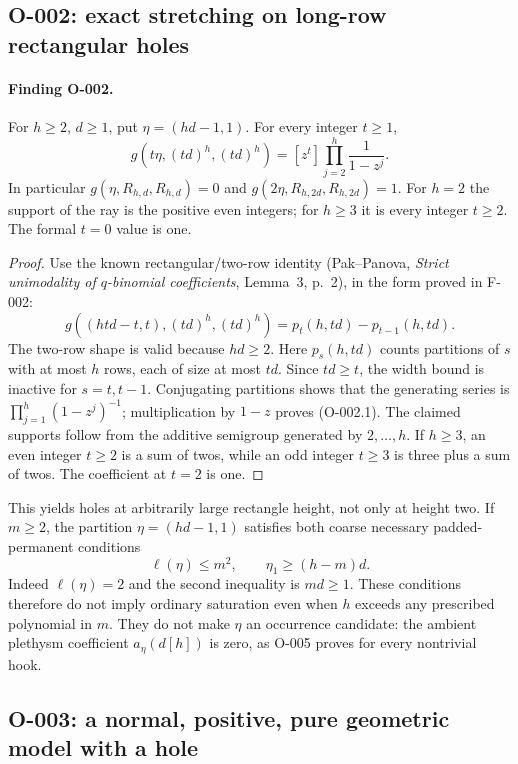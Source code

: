 \subsection{O-002: exact stretching on long-row rectangular holes}

\paragraph{Finding O-002.}
For $h\geq2$, $d\geq1$, put $\eta=(hd-1,1)$.  For every integer
$t\geq1$,
\[
 g(t\eta,(td)^h,(td)^h)
       =[z^t]\prod_{j=2}^{h}\frac1{1-z^j}.                 \tag{O-002.1}
\]
In particular $g(\eta,R_{h,d},R_{h,d})=0$ and
$g(2\eta,R_{h,2d},R_{h,2d})=1$.  For $h=2$ the support of the ray is
the positive even integers; for $h\geq3$ it is every integer $t\geq2$.
The formal $t=0$ value is one.

\begin{proof}
Use the known rectangular/two-row identity (Pak--Panova, \emph{Strict
unimodality of $q$-binomial coefficients}, Lemma~3, p.~2), in the form
proved in F-002:
\[
 g((htd-t,t),(td)^h,(td)^h)=p_t(h,td)-p_{t-1}(h,td).
\]
The two-row shape is valid because $hd\geq2$. Here $p_s(h,td)$ counts
partitions of $s$ with at most $h$ rows, each of size at most $td$.
Since $td\geq t$, the width bound is inactive for $s=t,t-1$.
Conjugating partitions shows that the generating series is
$\prod_{j=1}^{h}(1-z^j)^{-1}$; multiplication by $1-z$ proves
(O-002.1).  The claimed supports follow from the additive semigroup
generated by $2,\ldots,h$. If $h\geq3$, an even integer $t\geq2$ is a
sum of twos, while an odd integer $t\geq3$ is three plus a sum of twos.
The coefficient at $t=2$ is one.
\end{proof}

This yields holes at arbitrarily large rectangle height, not only at
height two.  If $m\geq2$, the partition $\eta=(hd-1,1)$ satisfies both
coarse necessary padded-permanent conditions
\[
                 \ell(\eta)\leq m^2,
       \qquad \eta_1\geq (h-m)d.
\]
Indeed $\ell(\eta)=2$ and the second inequality is $md\geq1$.
These conditions therefore do not imply ordinary saturation even when
$h$ exceeds any prescribed polynomial in $m$.  They do not make $\eta$
an occurrence candidate: the ambient plethysm coefficient
$a_{\eta}(d[h])$ is zero, as O-005 proves for every nontrivial hook.

\subsection{O-003: a normal, positive, pure geometric model with a hole}

